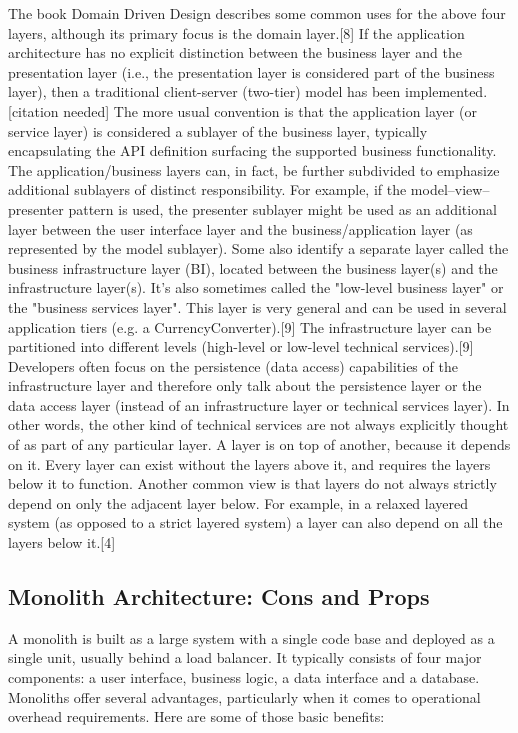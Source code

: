 The book Domain Driven Design describes some common uses for the above four layers, although its primary focus is the
domain layer.[8]
If the application architecture has no explicit distinction between the business layer and the presentation layer
(i.e., the presentation layer is considered part of the business layer), then a traditional client-server (two-tier)
model has been implemented.[citation needed]
The more usual convention is that the application layer (or service layer) is considered a sublayer of the business layer,
typically encapsulating the API definition surfacing the supported business functionality.
The application/business layers can, in fact, be further subdivided to emphasize additional sublayers of distinct
responsibility.
For example, if the model–view–presenter pattern is used, the presenter sublayer might be used as an additional layer
between the user interface layer and the business/application layer (as represented by the model sublayer).
Some also identify a separate layer called the business infrastructure layer (BI), located between the business layer(s)
and the infrastructure layer(s).
It's also sometimes called the "low-level business layer" or the "business services layer".
This layer is very general and can be used in several application tiers (e.g. a CurrencyConverter).[9]
The infrastructure layer can be partitioned into different levels (high-level or low-level technical services).[9]
Developers often focus on the persistence (data access) capabilities of the infrastructure layer and therefore only
talk about the persistence layer or the data access layer (instead of an infrastructure layer or technical services layer).
In other words, the other kind of technical services are not always explicitly thought of as part of any particular
layer.
A layer is on top of another, because it depends on it.
Every layer can exist without the layers above it, and requires the layers below it to function.
Another common view is that layers do not always strictly depend on only the adjacent layer below.
For example, in a relaxed layered system (as opposed to a strict layered system) a layer can also depend on all the layers below it.[4]

\subsection{Monolith Architecture: Cons and Props}\label{subsec:monolith-architecture:-cons-and-props}

A monolith is built as a large system with a single code base and deployed as a single unit, usually behind a load balancer.
It typically consists of four major components: a user interface, business logic, a data interface and a database.
Monoliths offer several advantages, particularly when it comes to operational overhead requirements.
Here are some of those basic benefits:


